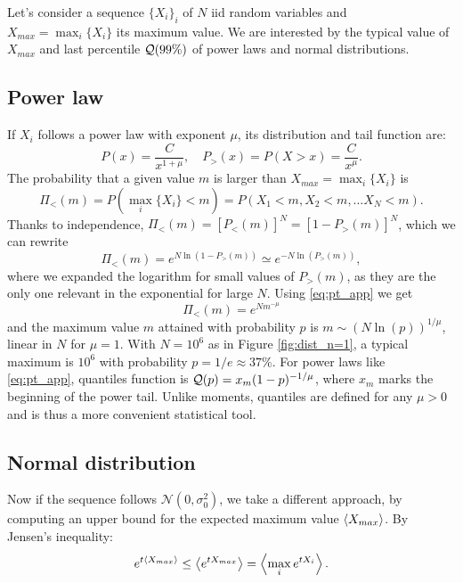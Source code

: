 \documentclass[FinalReport.tex]{subfiles}
\begin{document}
\label{app:max_distrib}
Let's consider a sequence $\{X_i\}_i$ of $N$ iid random variables and $X_{max}=\max_i\{X_i\}$ its maximum value. We are interested by the typical value of $X_{max}$ and last percentile $\mathcal{Q}(99\%)$ of power laws and normal distributions.

\subsection{Power law}
If $X_i$ follows a power law with exponent $\mu$, its distribution and tail function are:
\begin{equation}\label{eq:pt_app}
	P(x)=\frac{C}{x^{1+\mu}}, \quad P_>(x)=P(X>x)=\frac{C}{x^\mu}.
\end{equation}
The probability that a given value $m$ is larger than $X_{max}=\max_i \{X_i\}$ is  
\begin{equation}
	\Pi_<(m)=P(\max_i\{X_i\}<m)=P(X_1<m,X_2<m,\dots X_N<m).
\end{equation}
Thanks to independence, $\Pi_<(m)=[P_<(m)]^N=[1-P_>(m)]^N$, which we can rewrite
\begin{equation}
	\Pi_<(m)=e^{N\ln(1-P_>(m))}\simeq e^{-N\ln(P_>(m))},	
\end{equation}
where we expanded the logarithm for small values of $P_>(m)$, as they are the only one relevant in the exponential for large $N$. Using \eqref{eq:pt_app} we get
\begin{equation}
	\Pi_<(m)=e^{Nm^{-\mu}}	
\end{equation}
and the maximum value $m$ attained with probability $p$ is $m\sim (N\ln(p))^{1/\mu}$, linear in $N$ for $\mu=1$. With $N=10^6$ as in Figure \ref{fig:dist_n=1}, a typical maximum is $10^6$ with probability $p=1/e\approx 37\%$.
For power laws like \eqref{eq:pt_app}, quantiles function is $\mathcal{Q}(p)=x_m(1-p)^{-1/\mu}$, where $x_m$ marks the beginning of the power tail. Unlike moments, quantiles are defined for any $\mu>0$ and is thus a more convenient statistical tool.

	
\subsection{Normal distribution}
Now if the sequence follows $\mathcal{N}(0,\sigma_0^2)$, we take a different approach, by computing an upper bound for the expected maximum value $\expval{X_{max}}$.
By Jensen's inequality:
\begin{equation}
e^{t\expval{X_{max}}}\leq \expval{e^{tX_{max}}}=\expval{\max_{i}e^{tX_i}}.
\end{equation}
\end{document}
